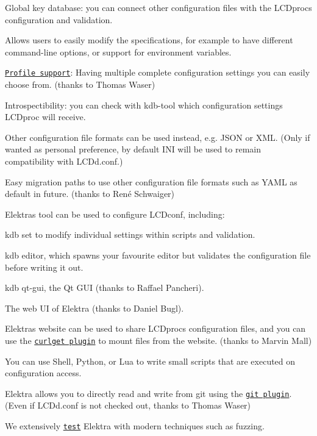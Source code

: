 \begin{DoxyItemize}
\item Global key database\+: you can connect other configuration files with the L\+C\+Dproc\textquotesingle{}s configuration and validation.
\item Allows users to easily modify the specifications, for example to have different command-\/line options, or support for environment variables.
\item \href{https://www.libelektra.org/plugins/profile}{\tt Profile support}\+: Having multiple complete configuration settings you can easily choose from. (thanks to Thomas Waser)
\item Introspectibility\+: you can check with {\ttfamily kdb}-\/tool which configuration settings L\+C\+Dproc will receive.
\item Other configuration file formats can be used instead, e.\+g. J\+S\+ON or X\+ML. (Only if wanted as personal preference, by default I\+NI will be used to remain compatibility with {\ttfamily L\+C\+Dd.\+conf}.)
\item Easy migration paths to use other configuration file formats such as Y\+A\+ML as default in future. (thanks to René Schwaiger)
\item Elektra\textquotesingle{}s tool can be used to configure L\+C\+Dconf, including\+:
\begin{DoxyItemize}
\item {\ttfamily kdb set} to modify individual settings within scripts and validation.
\item {\ttfamily kdb editor}, which spawns your favourite editor but validates the configuration file before writing it out.
\item {\ttfamily kdb qt-\/gui}, the Qt G\+UI (thanks to Raffael Pancheri).
\item The web UI of Elektra (thanks to Daniel Bugl).
\end{DoxyItemize}
\item Elektra\textquotesingle{}s website can be used to share L\+C\+Dproc\textquotesingle{}s configuration files, and you can use the \href{https://www.libelektra.org/plugins/curlget}{\tt curlget plugin} to mount files from the website. (thanks to Marvin Mall)
\item You can use Shell, Python, or Lua to write small scripts that are executed on configuration access.
\item Elektra allows you to directly read and write from git using the \href{https://www.libelektra.org/plugins/gitresolver}{\tt git plugin}. (Even if {\ttfamily L\+C\+Dd.\+conf} is not checked out, thanks to Thomas Waser)
\item We extensively \href{https://www.libelektra.org/devgettingstarted/testing}{\tt test} Elektra with modern techniques such as fuzzing.
\end{DoxyItemize}

